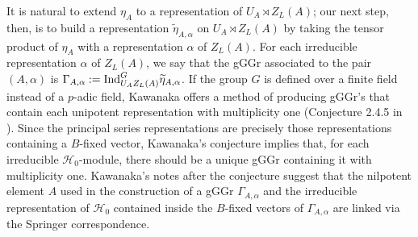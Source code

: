 \documentclass[11pt,letterpaper]{article}
\newcommand{\calH}{\mathcal{H}} %
\newcommand{\Ind}{\textup{Ind}}
\theoremstyle{remark}
\numberwithin{equation}{section}
\begin{document}

It is natural to extend $\eta_A$ to a representation of $U_A \rtimes Z_L(A)$; our next step, then, is to build a representation $\widetilde{\eta}_{A,\alpha}$ on $U_A\rtimes Z_L(A)$ by taking the tensor product of $\eta_A$ with a representation $\alpha$ of $Z_L(A)$. For each irreducible representation $\alpha$ of $Z_L(A)$, we say that the gGGr associated to the pair $(A,\alpha)$ is $\Gamma_{A,\alpha} := \Ind_{U_AZ_L(A)}^G \widetilde{\eta}_{A,\alpha}$. If the group $G$ is defined over a finite field instead of a $p$-adic field, Kawanaka offers a method of producing gGGr's that contain each unipotent representation with multiplicity one (Conjecture 2.4.5 in \cite{Kaw}). Since the principal series representations are precisely those representations containing a $B$-fixed vector, Kawanaka's conjecture implies that, for each irreducible $\calH_0$-module, there should be a unique gGGr containing it with multiplicity one. Kawanaka's notes after the conjecture suggest that the nilpotent element $A$ used in the construction of a gGGr $\Gamma_{A,\alpha}$ and the irreducible representation of $\calH_0$ contained inside the $B$-fixed vectors of $\Gamma_{A,\alpha}$ are linked via the Springer correspondence. 

\end{document}
